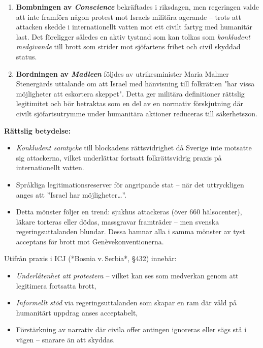 \begin{enumerate}
  \item \textbf{Bombningen av \textit{Conscience}} bekräftades i riksdagen, men regeringen valde att inte framföra någon protest mot Israels militära agerande – trots att attacken skedde i internationellt vatten mot ett civilt fartyg med humanitär last. Det föreligger således en aktiv tystnad som kan tolkas som \emph{konkludent medgivande} till brott som strider mot sjöfartens frihet och civil skyddad status.
  
  \item \textbf{Bordningen av \textit{Madleen}} följdes av utrikesminister Maria Malmer Stenergärds uttalande om att Israel med hänvisning till folkrätten "har vissa möjligheter att eskortera skeppet". Detta ger militära definitioner rättslig legitimitet och bör betraktas som en del av en normativ förskjutning där civilt sjöfartsutrymme under humanitära aktioner reduceras till säkerhetszon.
\end{enumerate}

\noindent
\textbf{Rättslig betydelse:}
\begin{itemize}
  \item \emph{Konkludent samtycke} till blockadens rättsvidrighet då Sverige inte motsatte sig attackerna, vilket underlättar fortsatt folkrättsvidrig praxis på internationellt vatten.
  \item Språkliga legitimationsreserver för angripande stat – när det uttryckligen anges att ”Israel har möjligheter…”.
  \item Detta mönster följer en trend: sjukhus attackeras (över 660 hälsocenter), läkare torteras eller dödas, massgravar framträder – men svenska regeringsuttalanden blundar. Dessa hamnar alla i samma mönster av tyst acceptans för brott mot Genèvekonventionerna.  
\end{itemize}

\noindent
Utifrån praxis i ICJ (*Bosnia v. Serbia*, §432) innebär:

\begin{itemize}
  \item \emph{Underlåtenhet att protestera} – vilket kan ses som medverkan genom att legitimera fortsatta brott,
  \item \emph{Informellt stöd} via regeringsuttalanden som skapar en ram där våld på humanitärt uppdrag anses acceptabelt,
  \item Förstärkning av narrativ där civila offer antingen ignoreras eller sägs stå i vägen – snarare än att skyddas.
\end{itemize}

